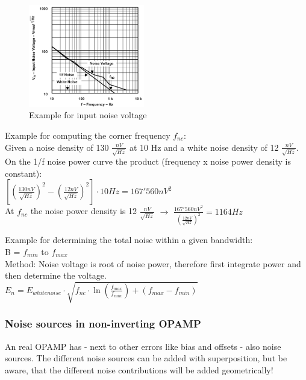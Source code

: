 			\begin{figure}[h]
				\centering
				\includegraphics[width=0.45\textwidth]{images/NoiseExample.png}
				\caption{Example for input noise voltage}
				\label{Fig:NoiseExample}
			\end{figure}
			Example for computing the corner frequency $f_{nc}$:\\
			Given a noise density of 130 $\frac{nV}{\sqrt{Hz}}$ at 10 Hz and a white noise density of 12 $\frac{nV}{\sqrt{Hz}}$. \\
			On the 1/f noise power curve the product (frequency x noise power density is constant):\\
			$\left[\left(\frac{130 nV}{\sqrt{Hz}}\right)^2 - \left(\frac{12 nV}{\sqrt{Hz}}\right)^2\right]\cdot 10Hz = 167'560 nV^2$\\
			At $f_{nc}$ the noise power density is 12 $\frac{nV}{\sqrt{Hz}}$ $\rightarrow$ $\frac{167'560 nV^2}{\left(\frac{12nV}{\sqrt{Hz}}\right)^2} = 1164 Hz$
	
			Example for determining the total noise within a given bandwidth:\\
			B = $f_{min}$ to $f_{max}$\\
			Method: Noise voltage is root of noise power, therefore first integrate power and then determine the voltage. \\
			$E_n = E_{whitenoise} \cdot \sqrt{f_{nc}\cdot \ln\left(\frac{f_{max}}{f_{min}}\right) + \left(f_{max}-f_{min}\right)}$\\
		\subsubsection{Noise sources in non-inverting OPAMP}	
			An real OPAMP has - next to other errors like bias and offsets - also noise sources. The different noise sources can be added with superposition, but be aware, that the different noise contributions will be added geometrically!\\
			
